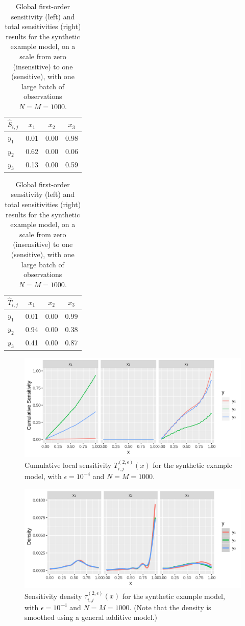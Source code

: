 \documentclass[12pt]{article}
\begin{document}
\begin{table}
\centering
\begin{tabular}{l|c|c|c}
$\hat{S}_{i,j}$ & $x_1$ & $x_2$ & $x_3$ \\
\hline
$y_1$ & 0.01 & 0.00 & 0.98 \\
$y_2$ & 0.62 & 0.00 & 0.06 \\
$y_3$ & 0.13 & 0.00 & 0.59 \\
\end{tabular}
\quad
\begin{tabular}{l|c|c|c}
$\hat{T}_{i,j}$ & $x_1$ & $x_2$ & $x_3$ \\
\hline
$y_1$ & 0.01 & 0.00 & 0.99 \\
$y_2$ & 0.94 & 0.00 & 0.38 \\
$y_3$ & 0.41 & 0.00 & 0.87 \\
\end{tabular}
\caption{Global first-order sensitivity (left) and total sensitivities (right) results for the synthetic example model, on a scale from zero (insensitive) to one (sensitive), with one large batch of observations $N = M = 1000$.}
\label{tab:toyglobal}
\end{table}

\begin{figure}
    \centering
    \includegraphics[width=1.00\linewidth]{figures/toy-tx.png}
    \caption{Cumulative local sensitivity $T_{i,j}^{(2,\epsilon)}(x)$ for the synthetic example model, with $\epsilon = 10^{-4}$ and $N = M = 1000$.}
    \label{fig:toy-tx}
\end{figure}

\begin{figure}
    \centering
    \includegraphics[width=1.00\linewidth]{figures/toy-tau.png}
    \caption{Sensitivity density $\tau_{i,j}^{(2,\epsilon)}(x)$ for the synthetic example model, with $\epsilon = 10^{-4}$ and $N = M = 1000$. (Note that the density is smoothed using a general additive model.)}
    \label{fig:toy-tau}
\end{figure}
\end{document}
